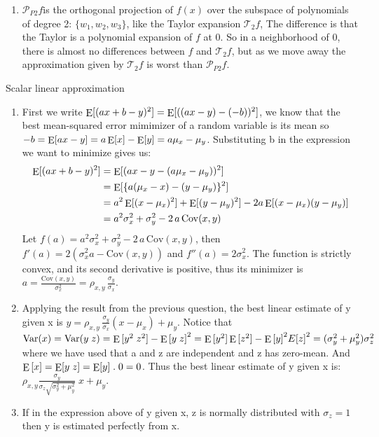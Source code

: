 \documentclass[10pt]{article}
\DeclareMathOperator*{\E}{\rm E}
\newcommand{\be}{\begin{enumerate}}
\newcommand{\ee}{\end{enumerate}}
\newcommand{\0}{\mat{0}}
\newcommand{\Var}{\mathrm{Var}}
\newcommand{\Cov}{\mathrm{Cov}}
\begin{document}
\begin{enumerate}
	\item $\mathcal{P}_{P2} f$is the orthogonal projection of $f(x)$ over the subspace of polynomials of degree 2: $\{ w_1, w_2, w_3 \}$, like the Taylor expansion $\mathcal{T}_2 f$, The difference is that the Taylor is a polynomial expansion of $f$ at 0. So in a neighborhood of $0$, there is almost no differences between $f$ and $\mathcal{T}_2 f$, but as we move away the approximation given  by $\mathcal{T}_2 f$ is worst than  $\mathcal{P}_{P2} f$. 
\ee	

\item Scalar linear approximation
\be
	\item First we write $\E[(a x + b - y)^2] = \E[((a x -y) - (-b))^2]$, we know that the best mean-squared error mimimizer of a random variable is its mean so $-b=\E[ax-y] = a \E[x] - \E[y]= a \mu_x - \mu_y$.
	Substituting b in the expression we want to minimize gives us:
	\begin{align*}
		\E[(a x + b - y)^2] 	&= \E[ ( a x - y -  ( a \mu_x - \mu_y) )^2 ] \\
						&= \E[ \{ a (\mu_x - x)  - (y-\mu_y)  \}^2 ] \\
						&= a^2 \E[(x - \mu_x)^2]  + \E[ (y-\mu_y)^2]  -2 a \E[(x - \mu_x) (y-\mu_y)] \\
						&= a^2 \sigma_x^2 + \sigma_y^2 -2\, a\, \Cov(x,y)
	\end{align*}
	Let $f(a) =  a^2 \sigma_x^2 + \sigma_y^2 -2\, a\, \Cov(x,y)$, then $f'(a) = 2 (\sigma_x^2 a - \Cov(x,y))$ and $f''(a) = 2 \sigma_x^2 $.
	The function is strictly convex, and its second derivative is positive, thus its minimizer is $a = \frac{ \Cov(x,y)} {\sigma_x^2} = \rho_{x,y}\, \frac{\sigma_y}{\sigma_x}$.
	
	\item Applying the result from the previous question, the best linear estimate of y given x is $y = \rho_{x,y}\, \frac{\sigma_y}{\sigma_x} (x - \mu_x)  + \mu_y$.
	Notice that $\Var{(x)} = \Var{(y \; z)} = \E{[y^2 \; z^2]} - \E{[y \; z]}^2 = \E{[y^2]}  \E{[z^2]} - \E{[y]}^2  E{[z]}^2 = (\sigma_y^2 + \mu_y^2) \sigma_z^2$ where we have used that a and z are independent and z has zero-mean. And $\E{[x]} = \E[y \; z] = \E[y] \; . \; 0 = 0$. Thus the  best linear estimate of y given x is: $\rho_{x,y} \frac{\sigma_y} {\sigma_z \sqrt{\sigma_y^2 + \mu_y^2}} \; x + \mu_y$.
	 
	 \item If in the expression above of y given x, z is normally distributed with $\sigma_z =1$ then y is estimated perfectly from x.  
	 

\end{enumerate}
\end{document}
